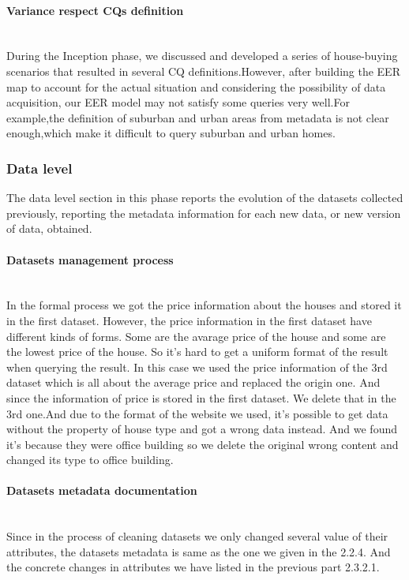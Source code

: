 \paragraph{Variance respect CQs definition}\mbox{}\\
During the Inception phase, we discussed and developed a series of house-buying scenarios that resulted in several CQ definitions.However, after building the EER map to account for the actual situation and considering the possibility of data acquisition, our EER model may not satisfy some queries very well.For example,the definition of suburban and urban areas from metadata is not clear enough,which make it difficult to query suburban and urban homes.

\subsubsection{Data level}
The data level section in this phase reports the evolution of the datasets collected previously, reporting the metadata information for each new data, or new version of data, obtained.

\paragraph{Datasets management process}\mbox{}\\
In the formal process we got the price information about the houses and stored it in the first dataset. However, the price information in the first dataset have different kinds of forms. Some are the avarage price of the house and some are the lowest price of the house. So it's hard to get a uniform format of the result when querying the result. In this case we used the price information of the 3rd dataset which is all about the average price and replaced the origin one. And since the information of price is stored in the first dataset. We delete that in the 3rd one.And due to the format of the website we used, it's possible to get data without the property of house type and got a wrong data instead. And we found it's because they were office building so we delete the original wrong content and changed its type to office building.

\paragraph{Datasets metadata documentation}\mbox{}\\
Since in the process of cleaning datasets we only changed several value of their attributes, the datasets metadata is same as the one we given in the 2.2.4. And the concrete changes in attributes we have listed in the previous part 2.3.2.1.
